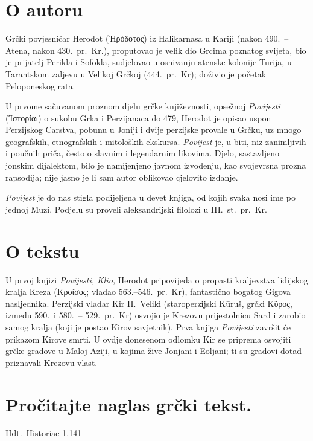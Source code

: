 \section*{O autoru}

Grčki povjesničar Herodot (Ἡρόδοτος) iz Halikarnasa u Kariji (nakon 490.\ – Atena, nakon 430.\ pr.~Kr.), proputovao je velik dio Grcima poznatog svijeta, bio je prijatelj Perikla i Sofokla, sudjelovao u osnivanju atenske kolonije Turija, u Tarantskom zaljevu u Velikoj Grčkoj (444.\ pr.~Kr); doživio je početak Peloponeskog rata.

U prvome sačuvanom proznom djelu grčke književnosti, opsežnoj \textit{Povijesti} (Ἱστορίαı) o sukobu Grka i Perzijanaca do 479, Herodot je opisao uspon Perzijskog Carstva, pobunu u Joniji i dvije perzijske provale u Grčku, uz mnogo geografskih, etnografskih i mitoloških ekskursa. \textit{Povijest} je, u biti, niz zanimljivih i poučnih priča, često o slavnim i legendarnim likovima. Djelo, sastavljeno jonskim dijalektom, bilo je namijenjeno javnom izvođenju, kao svojevrsna prozna rapsodija; nije jasno je li sam autor oblikovao cjelovito izdanje. 

\textit{Povijest} je do nas stigla podijeljena u devet knjiga, od kojih svaka nosi ime po jednoj Muzi. Podjelu su proveli aleksandrijski filolozi u III.~st.\ pr.~Kr.

\section*{O tekstu}

U prvoj knjizi \textit{Povijesti, Klio,} Herodot pripovijeda o propasti kraljevstva lidijskog kralja Kreza (Κροῖσος; vladao 563.–546.\ pr.~Kr), fantastično bogatog Gigova nasljednika. Perzijski vladar Kir II.\ Veliki (staroperzijski Kūruš, grčki Κῦρος, između 590.\ i 580.\ – 529.\ pr.~Kr) osvojio je Krezovu prijestolnicu Sard i zarobio samog kralja (koji je postao Kirov savjetnik). Prva knjiga \textit{Povijesti} završit će prikazom Kirove smrti. U ovdje donesenom odlomku Kir se priprema osvojiti grčke gradove u Maloj Aziji, u kojima žive Jonjani i Eoljani; ti su gradovi dotad priznavali Krezovu vlast.


\section*{Pročitajte naglas grčki tekst.}

Hdt.\ Historiae 1.141

